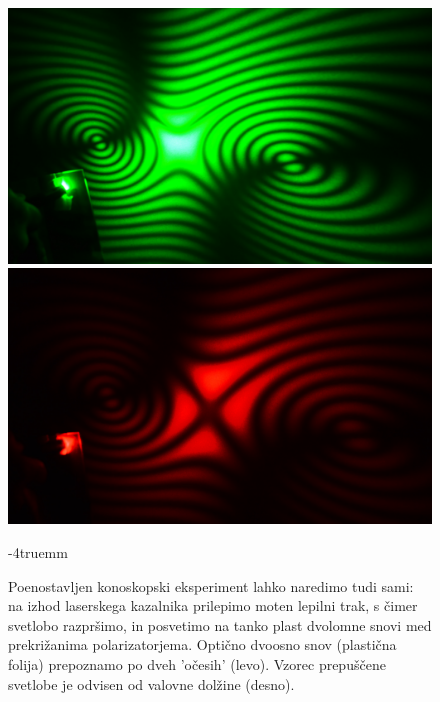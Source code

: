 \begin{figure}[ht]
\centering
\includegraphics[width=7truecm]{slike/10_Konoskopija1.jpg}\hfill
\includegraphics[width=7truecm]{slike/10_Konoskopija2.jpg}
\caption{Poenostavljen konoskopski eksperiment lahko naredimo tudi sami: na izhod laserskega
kazalnika prilepimo moten lepilni trak, s čimer svetlobo razpršimo, in posvetimo na tanko plast
dvolomne snovi med prekrižanima polarizatorjema. Optično dvoosno snov (plastična folija)
prepoznamo po dveh 'očesih' (levo). Vzorec prepuščene svetlobe je odvisen od valovne dolžine (desno).}
\label{fig:10_konoskopija}
\vglue-4truemm
\end{figure}
